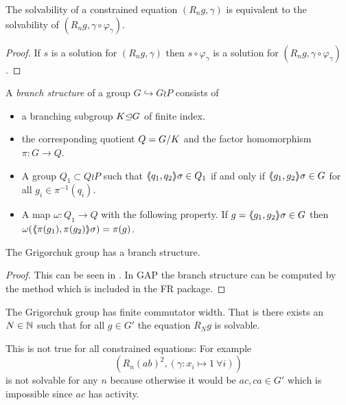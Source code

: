 \documentclass[a4paper,11pt]{amsart}
\begin{document}
\begin{lem} \label{lem:solvabilityWithReducedConstraint}
 The solvability of a constrained equation $(R_n g,\gamma)$ is equivalent to the solvability of $(R_n g,\gamma\circ \varphi_\gamma)$.
\end{lem}
 \begin{proof}
 If $s$ is a solution for $(R_n g,\gamma)$ then $s\circ \varphi_\gamma$ is
 a solution for $(R_n g,\gamma\circ \varphi_\gamma)$. 
\end{proof}


\begin{defi} 
A \emph{branch structure} of a group $G\hookrightarrow G \wr P$ consists of  
\begin{itemize}
 \item a branching subgroup $K{\mathrel\trianglelefteq} G$ of finite index. 
 \item the corresponding quotient $Q={G/K}$ and the factor homomorphism $\pi\colon G \to Q$.
 \item A group $Q_1 \subset Q \wr P$ such that $\langle\negthickspace\langle q_1,q_2\rangle\negthickspace\rangle\sigma\in Q_1$ if and only if $\langle\negthickspace\langle g_1,g_2\rangle\negthickspace\rangle\sigma \in G$ for all $g_i \in \pi^{-1}(q_i)$.
 \item A map $\omega\colon Q_1 \to Q$ with the following property. If $g=\langle\negthickspace\langle g_1,g_2\rangle\negthickspace\rangle\sigma \in G$ then $\omega(\langle\negthickspace\langle\pi(g_1),\pi(g_2)\rangle\negthickspace\rangle\sigma) = \pi(g)$.
\end{itemize}
\end{defi}
\begin{lem}
 The Grigorchuk group has a branch structure.
\end{lem}
\begin{proof}
 This can be seen in \cite{Bartholdi:RepresentationZetaFunctions}. In GAP the branch structure can be computed
 by the method  which is included in the FR package. 
\end{proof}


\begin{thm}\label{IgorsThm}
 The Grigorchuk group has finite commutator width. That is
 there exists an $N\in\mathbb{N}$ such that for all $g\in G'$ the equation $R_Ng$ is solvable.
\end{thm}
\begin{re}
 This is not true for all constrained equations: For example
 \[\left(R_n(ab)^2,(\gamma\colon x_i\mapsto 1\ \forall i)\right)\] 
 is not solvable for any $n$ because otherwise it would be $ac,ca\in G'$ 
 which is impossible since $ac$ has activity.
\end{re}
\end{document}
